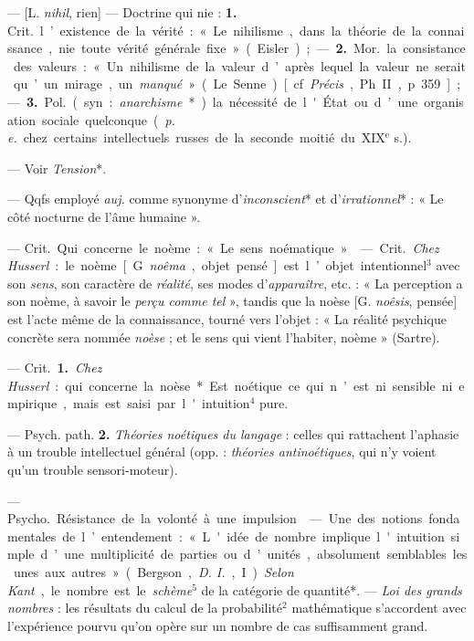 \begin{itemize}[leftmargin=1cm, label=, itemsep=1pt]
 — [L. {\it nihil}, rien] —  Doctrine qui nie :
{\bf 1.} \si{Crit.} l’existence de la vérité : « Le nihilisme, dans la
théorie de la connaissance, nie toute vérité générale fixe » (Eisler) ; — 
{\bf 2.} \si{Mor.} la consistance des valeurs : « ... Un nihilisme de la
valeur d’après lequel la valeur ne serait qu’un mirage, un {\it manqué} » (Le
Senne) [cf. {\it Précis}, Ph. II, p. 359] ; — {\bf 3.} \si{Pol.} (syn. :
{\it anarchisme}*) la nécessité de l'État ou d’une organisation sociale
quelconque ({\it p. e.} chez certains intellectuels russes de la seconde
moitié du {\footnotesize XIX}$^\text{e}$ s.).

 — Voir {\it Tension}*.

 — Qqfs employé {\it auj.} comme synonyme d’{\it inconscient}*
et d’{\it irrationnel}* : « Le côté nocturne de l’âme humaine ».

 — \si{Crit.} Qui concerne le noème : « Le sens noématique. »

 — \si{Crit.} {\it Chez Husserl} : le noème [G. {\it noêma},
objet pensé] est l’objet intentionnel$^3$ avec son {\it sens}, son caractère
de {\it réalité}, ses modes d’{\it apparaître}, etc. : « La perception a son
noème, à savoir le {\it perçu comme tel} », tandis que la noèse [G.
{\it noêsis}, pensée] est l’acte même de la connaissance, tourné vers
l'objet : « La réalité psychique concrète sera nommée {\it noèse} ; et le
sens qui vient l'habiter, noème » (Sartre).

 — \si{Crit.} {\bf 1.} {\it Chez Husserl} : qui concerne la
noèse*. Est noétique ce qui n’est ni sensible ni empirique, mais est saisi
par l'intuition$^4$ pure.

— Psych. path. {\bf 2.} {\it Théories noétiques du langage} : celles qui
rattachent l’aphasie à un trouble intellectuel général (opp. : {\it théories
antinoétiques}, qui n’y voient qu'un trouble sensori-moteur).

 — \si{Psycho.} Résistance de la volonté à une impulsion.

 — Une des notions fondamentales de l’entendement : « L'idée de
nombre implique l'intuition simple d’une multiplicité de parties ou d’unités,
absolument semblables les unes aux autres » (Bergson, {\it D. I.}, I).
{\it Selon Kant}, le nombre est le {\it schème}$^5$ de la catégorie de
quantité*. — {\it Loi des grands nombres} : les résultats du calcul de la
probabilité$^2$ mathématique s'accordent avec l'expérience pourvu qu'on opère
sur un nombre de cas suffisamment grand.


\end{itemize}
